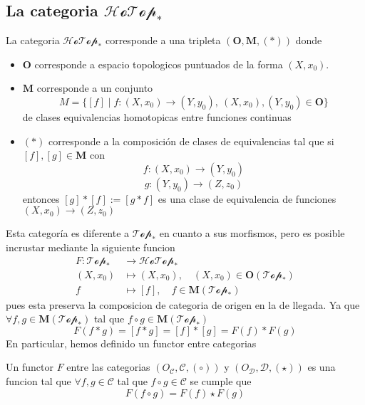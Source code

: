 \subsection{La categoria \(\mathscr{HoTop}_*\)}
\begin{definicion}
  La categoria \(\mathscr{HoTop}_*\) corresponde a una tripleta
  \((\mathbf{O},\mathbf M, (*))\) donde
  \begin{itemize}
  \item \(\mathbf O\) corresponde a espacio topologicos puntuados de la
    forma \((X, x_0)\).
  \item \(\mathbf M\) corresponde a un conjunto
    \[ M = \{ [f] \mid f : (X,x_0) \to (Y,y_0),\ (X,x_0),(Y,y_0) \in
      \mathbf O \}\]
    de clases equivalencias homotopicas entre funciones continuas
  \item \((*)\) corresponde a la composición de clases de
    equivalencias tal que si \([f] , [g] \in \mathbf M \) con
    \[ f : (X,x_0) \to (Y, y_0)\]
    \[ g : (Y, y_0) \to (Z, z_0)\]
    entonces \([g] * [f] := [ g * f ] \) es una clase de equivalencia de
    funciones \((X, x_0) \to (Z, z_0)\)
  \end{itemize}
\end{definicion}
Esta categoría es diferente a \(\mathscr{Top}_*\) en cuanto a sus
morfismos, pero es posible incrustar mediante la siguiente funcion
\begin{align*}
  F : \mathscr{Top}_* &\longrightarrow \mathscr{HoTop}_* \\
      \left( X , x_0 \right) &\longmapsto \left( X , x_0 \right), \quad \left( X, x_0 \right) \in \mathbf O \left( \mathscr{Top}_* \right) \\
      f &\longmapsto [f], \quad f \in \mathbf M \left( \mathscr{Top}_* \right)
\end{align*}
pues esta preserva la composicion de categoria de origen en la de
llegada. Ya que \(\forall f,g \in \mathbf M (\mathscr{Top}_*)\) tal que
\(f \circ g \in \mathbf M (\mathscr{Top}_*)\)
\[ F(f * g) = [f * g] = [f] * [g] = F(f) * F(g) \]
En particular, hemos definido un functor entre categorias
\begin{definicion}[Functor]
  Un functor \(F\) entre las categorias \( \left( O_{\mathcal C} ,
    \mathcal C , (\circ) \right) \) y \(\left( O_{\mathcal D} , \mathcal
      D , (\star) \right)\)
  es una funcion tal que \(\forall f,g \in \mathcal C \) tal que \( f
  \circ g \in \mathcal C\) se cumple que
  \[ F(f \circ g) = F(f) \star F(g) \]
\end{definicion}

